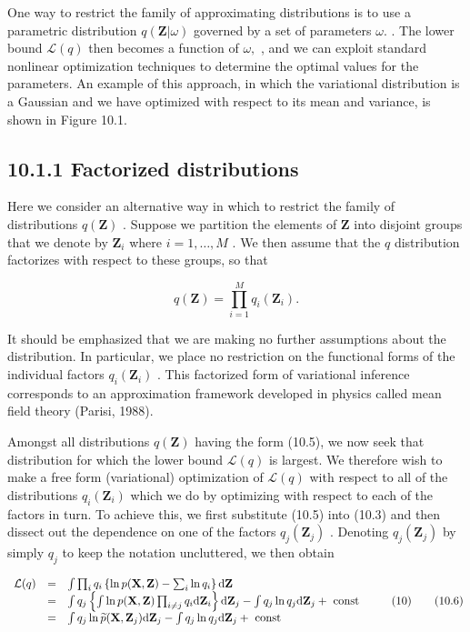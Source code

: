 \documentclass[
  10
]{article}
\begin{document}
One way to restrict the family of approximating distributions is to use
a parametric distribution \(q ( \mathbf { Z } | \omega )\) governed by a
set of parameters \(\omega .\) . The lower bound
\(\mathcal { L } ( q )\) then becomes a function of \(\omega ,\) , and
we can exploit standard nonlinear optimization techniques to determine
the optimal values for the parameters. An example of this approach, in
which the variational distribution is a Gaussian and we have optimized
with respect to its mean and variance, is shown in Figure 10.1.

\subsection{10.1.1 Factorized
distributions}\label{factorized-distributions}

Here we consider an alternative way in which to restrict the family of
distributions \(q ( \mathbf { Z } )\) . Suppose we partition the
elements of \(\mathbf { Z }\) into disjoint groups that we denote by
\(\mathbf { Z } _ { i }\) where \(i = 1 , \dots , M\) . We then assume
that the \(q\) distribution factorizes with respect to these groups, so
that

\[
q (\mathbf {Z}) = \prod_ {i = 1} ^ {M} q _ {i} (\mathbf {Z} _ {i}).\tag{10.5}
\]

It should be emphasized that we are making no further assumptions about
the distribution. In particular, we place no restriction on the
functional forms of the individual factors
\(q _ { i } ( \mathbf { Z } _ { i } )\) . This factorized form of
variational inference corresponds to an approximation framework
developed in physics called mean field theory (Parisi, 1988).

Amongst all distributions \(q ( \mathbf { Z } )\) having the form
(10.5), we now seek that distribution for which the lower bound
\(\mathcal { L } ( q )\) is largest. We therefore wish to make a free
form (variational) optimization of \(\mathcal { L } ( q )\) with respect
to all of the distributions \(q _ { i } ( \mathbf { Z } _ { i } )\)
which we do by optimizing with respect to each of the factors in turn.
To achieve this, we first substitute (10.5) into (10.3) and then dissect
out the dependence on one of the factors
\(q _ { j } ( \mathbf { Z } _ { j } )\) . Denoting
\(q _ { j } ( \mathbf { Z } _ { j } )\) by simply \(q _ { j }\) to keep
the notation uncluttered, we then obtain

\[
\begin{array}{r c l} \mathcal {L} (q) & = & \int \prod_ {i} q _ {i} \left\{\ln p (\mathbf {X}, \mathbf {Z}) - \sum_ {i} \ln q _ {i} \right\} \mathrm{d} \mathbf {Z} \\ & = & \int q _ {j} \left\{\int \ln p (\mathbf {X}, \mathbf {Z}) \prod_ {i \neq j} q _ {i} \mathrm{d} \mathbf {Z} _ {i} \right\} \mathrm{d} \mathbf {Z} _ {j} - \int q _ {j} \ln q _ {j} \mathrm{d} \mathbf {Z} _ {j} + \text { const } \\ & = & \int q _ {j} \ln \widetilde {p} (\mathbf {X}, \mathbf {Z} _ {j})   \mathrm{d} \mathbf {Z} _ {j} - \int q _ {j} \ln q _ {j}   \mathrm{d} \mathbf {Z} _ {j} + \text { const } \end{array} \tag {10}\tag{10.6}
\]
\end{document}
